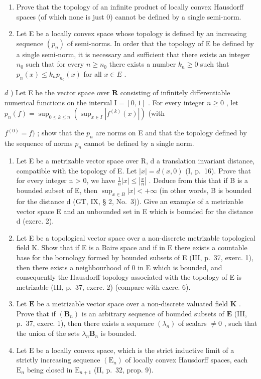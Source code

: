 \begin{enumerate}
\def\labelenumi{\alph{enumi})}
\setcounter{enumi}{1}
\item
  Prove that the topology of an infinite product of locally convex Hausdorff spaces (of which none is just 0) cannot be defined by a single semi-norm.
\item
  Let E be a locally convex space whose topology is defined by an increasing sequence \((p_n)\) of semi-norms. In order that the topology of E be defined by a single semi-norm, it is necessary and sufficient that there exists an integer \(n_0\) such that for every \(n \geqslant n_0\) there exists a number \(k_n \geqslant 0\) such that \(p_n(x) \leqslant k_n p_{n_0}(x)\) for all \(x \in E\) .
\end{enumerate}

\(d\) ) Let E be the vector space over \(\mathbf{R}\) consisting of infinitely differentiable numerical functions on the interval \(\mathrm{I} = [0,1]\) . For every integer \(n\geqslant 0\) , let \(p_n(f) = \sup_{0\leqslant k\leqslant n}\left(\sup_{x\in I}|f^{(k)}(x)|\right)\) (with

\(f^{(0)} = f)\) ; show that the \(p_n\) are norms on E and that the topology defined by the sequence of norms \(p_n\) cannot be defined by a single norm.

\begin{enumerate}
\def\labelenumi{\arabic{enumi})}
\setcounter{enumi}{2}
\item
  Let E be a metrizable vector space over R, d a translation invariant distance, compatible with the topology of E. Let \(|x| = d(x, 0)\) (I, p.~16). Prove that for every integer n \textgreater{} 0, we have \(\frac{1}{n}|x| \leqslant \left|\frac{x}{n}\right|\) . Deduce from this that if B is a bounded subset of E, then \(\sup_{x \in B} |x| < +\infty\) (in other words, B is bounded for the distance d (GT, IX, § 2, No.~3)). Give an example of a metrizable vector space E and an unbounded set in E which is bounded for the distance d (exerc. 2).
\item
  Let E be a topological vector space over a non-discrete metrizable topological field K. Show that if E is a Baire space and if in E there exists a countable base for the bornology formed by bounded subsets of E (III, p.~37, exerc. 1), then there exists a neighbourhood of 0 in E which is bounded, and consequently the Hausdorff topology associated with the topology of E is metrizable (III, p.~37, exerc. 2) (compare with exerc. 6).
\item
  Let \(\mathbf{E}\) be a metrizable vector space over a non-discrete valuated field \(\mathbf{K}\) . Prove that if \((\mathbf{B}_n)\) is an arbitrary sequence of bounded subsets of \(\mathbf{E}\) (III, p.~37, exerc. 1), then there exists a sequence \((\lambda_n)\) of scalars \(\neq 0\) , such that the union of the sets \(\lambda_n\mathbf{B}_n\) is bounded.
\item
  Let \(\mathrm{E}\) be a locally convex space, which is the strict inductive limit of a strictly increasing sequence \((\mathrm{E}_n)\) of locally convex Hausdorff spaces, each \(\mathrm{E}_n\) being closed in \(\mathrm{E}_{n+1}\) (II, p.~32, prop. 9).
\end{enumerate}


